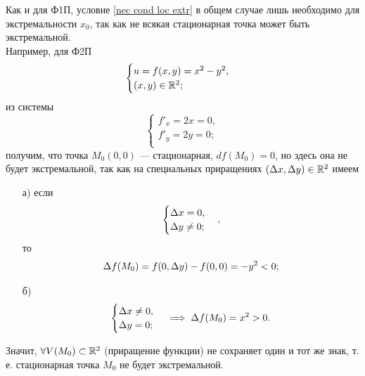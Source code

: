 \documentclass[../../main.tex]{subfiles}
\begin{document}
	\begin{rem}
		Как и для Ф1П, условие \eqref{nec cond loc extr} в общем случае
		лишь необходимо для экстремальности $x_0$, так как не всякая
		стационарная точка может быть экстремальной. \\
		Например, для Ф2П
		\[
		\begin{cases}
			u = f (x, y) = x^2 - y^2, \\
			(x, y) \in \mathbb{R}^2; \\
		\end{cases}
		\]
		из системы
		\[
		\begin{cases}
			f'_x = 2x = 0, \\
			f'_y = 2y = 0; \\
		\end{cases}
		\]
		получим, что точка $M_0 (0, 0)$ --- стационарная,
		$df (M_0) = 0$,
		но здесь она не будет экстремальной, так как на специальных приращениях
		$(\Delta x, \Delta y) \in \mathbb{R}^2$ имеем
		\begin{enumerate}
			\item[а)]
			если
			\[
			\begin{cases}
				\Delta x = 0, \\
				\Delta y \ne 0; \\
			\end{cases},
			\]
			то
			\[
				\Delta f (M_0)
				= f (0, \Delta y) - f (0, 0)
				= -y^2 < 0;
			\]
			
			\item[б)]
			\[
			\begin{cases}
				\Delta x \ne 0, \\
				\Delta y = 0; \\
			\end{cases}
			\implies
			\Delta f (M_0)
			= x^2 > 0.
			\]
		\end{enumerate}
		Значит, $\forall V (M_0) \subset \mathbb{R}^2$ (приращение функции)
		не сохраняет один и тот же знак, т. е. стационарная точка $M_0$
		не будет экстремальной.
	\end{rem}
	
\end{document}
